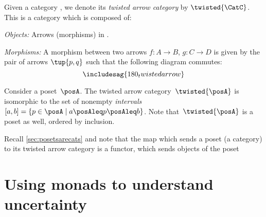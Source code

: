 




\begin{ctdefinition}
  \label{def:twisted-arrow}
  Given a category \CatC, we denote its \emph{twisted arrow category} by $\twisted{\CatC}$. This is a category which is composed of:
  \begin{compactenum}
    \item \emph{Objects:} Arrows (morphisms) in \CatC.
    \item \emph{Morphisms:} A morphism between two arrows $f\colon A\to B$, $g\colon C\to D$ is given by the pair of arrows $\tup{p,q}$ such that the following diagram commutes:
    \begin{equation}
      \includesag{180_twistedarrow}
    \end{equation}
  \end{compactenum}
\end{ctdefinition}

\begin{example}[Intervals]
  Consider a poset~$\posA$. The twisted arrow category~$\twisted{\posA}$ is isomorphic to the set of nonempty \emph{intervals}~$[a,b]=\{p \in \posA \mid a\posAleq p \posAleq b\}$. Note that~$\twisted{\posA}$ is a poset as well, ordered by inclusion.
\end{example}
\begin{remark}
  Recall \cref{sec:posetsarecats} and note that the map which sends a poset (a category) to its twisted arrow category is a functor, which sends objects of the poset
\end{remark}


\section{Using monads to understand uncertainty}

